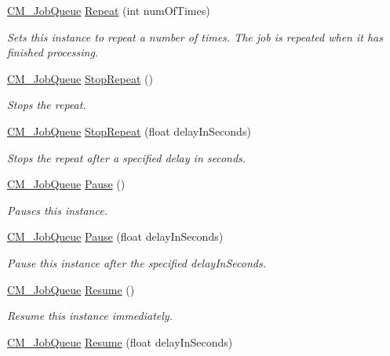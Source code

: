 \begin{DoxyCompactItemize}
\hyperlink{class_c_m___job_queue}{C\+M\+\_\+\+Job\+Queue} \hyperlink{class_c_m___job_queue_a26edb6cc573aed7c1804b7a6dae1d450}{Repeat} (int num\+Of\+Times)
\begin{DoxyCompactList}\small\item\em Sets this instance to repeat a number of times. The job is repeated when it has finished processing. \end{DoxyCompactList}\item 
\hyperlink{class_c_m___job_queue}{C\+M\+\_\+\+Job\+Queue} \hyperlink{class_c_m___job_queue_a4b9474030edaa4b85e120774858b2050}{Stop\+Repeat} ()
\begin{DoxyCompactList}\small\item\em Stops the repeat. \end{DoxyCompactList}\item 
\hyperlink{class_c_m___job_queue}{C\+M\+\_\+\+Job\+Queue} \hyperlink{class_c_m___job_queue_a863d01fa168f36f665787bb2b1a8be1c}{Stop\+Repeat} (float delay\+In\+Seconds)
\begin{DoxyCompactList}\small\item\em Stops the repeat after a specified delay in seconds. \end{DoxyCompactList}\item 
\hyperlink{class_c_m___job_queue}{C\+M\+\_\+\+Job\+Queue} \hyperlink{class_c_m___job_queue_a40d741107627777352ebd2e0478f3955}{Pause} ()
\begin{DoxyCompactList}\small\item\em Pauses this instance. \end{DoxyCompactList}\item 
\hyperlink{class_c_m___job_queue}{C\+M\+\_\+\+Job\+Queue} \hyperlink{class_c_m___job_queue_a705adde1f43487cf5b78599e09c85180}{Pause} (float delay\+In\+Seconds)
\begin{DoxyCompactList}\small\item\em Pause this instance after the specified delay\+In\+Seconds. \end{DoxyCompactList}\item 
\hyperlink{class_c_m___job_queue}{C\+M\+\_\+\+Job\+Queue} \hyperlink{class_c_m___job_queue_a6d3357eaff31b561a0db4de7e14e937b}{Resume} ()
\begin{DoxyCompactList}\small\item\em Resume this instance immediately. \end{DoxyCompactList}\item 
\hyperlink{class_c_m___job_queue}{C\+M\+\_\+\+Job\+Queue} \hyperlink{class_c_m___job_queue_a4d7818132595a2a97b9350f810405c1c}{Resume} (float delay\+In\+Seconds)

\end{DoxyCompactItemize}
